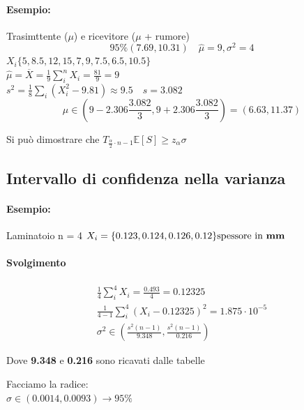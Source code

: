 \documentclass[]{article}
\newcommand{\ev}{\mathbb{E}[X]}
\renewcommand{\ev}[1]{\mathbb{E}[#1]}
\begin{document}
    \paragraph{Esempio:} Trasimttente ($\mu$) e ricevitore ($\mu$ + rumore)
    \[ 95\% (7.69, 10.31) \quad \hat{\mu} = 9, \sigma^2 = 4 \]
    $X_i \{ 5, 8.5, 12, 15, 7, 9, 7.5, 6.5, 10.5 \}$ \\
    $\hat{\mu} = \overline{X} = \frac{1}{9} \sum_{i}^{n} X_i = \frac{81}{9} = 9$ \\
    $s^2 = \frac{1}{8}\sum_{i}^{}(X_i^2-9.81) \approx 9.5 \quad s = 3.082$
    \[ \mu \in (9-2.306 \frac{3.082}{3}, 9 + 2.306 \frac{3.082}{3}) = (6.63, 11.37) \]
    \centerline{Si può dimostrare che $T_{\frac{\alpha}{2} \cdot n - 1} \ev{S} \geq z_\alpha\sigma$}

    \subsection{Intervallo di confidenza nella varianza}
    \paragraph{Esempio:} Laminatoio n = 4
    $X_i = \{ 0.123, 0.124, 0.126, 0.12 \} \text{spessore in \textbf{mm}}$ \\
    \paragraph{Svolgimento}
    \begin{equation*}
        \begin{aligned}
            \frac{1}{4} \sum_{i}^{4} X_i = \frac{0.493}{4} = 0.12325 \\
            \frac{1}{4-1} \sum_{i}^{4}\left ( X_i - 0.12325 \right )^2 = 1.875 \cdot 10^{-5} \\
            \sigma^2 \in \left ( \frac{s^2(n-1)}{9.348}, \frac{s^2(n-1)}{0.216} \right )
        \end{aligned} 
    \end{equation*}
    \centerline{Dove \textbf{9.348} e \textbf{0.216} sono ricavati dalle tabelle}
    Facciamo la radice: \\
    $\sigma \in (0.0014, 0.0093) \rightarrow 95\% $
\end{document}
